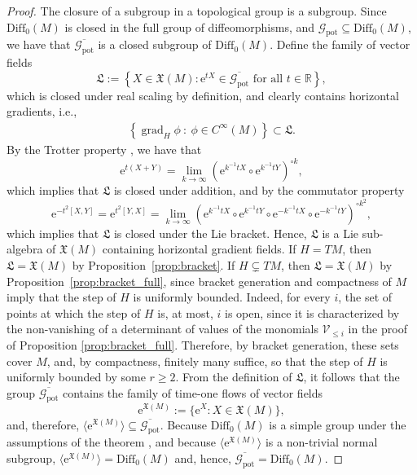 \documentclass{article}
\theoremstyle{remark}
\newcommand{\M}{M}
\newcommand{\Cinf}{C^{\infty}(\M)}
\newcommand{\X}{\mathfrak{X}(\M)}
\newcommand{\Diff}{\mathrm{Diff}_0(\M)}
\DeclareMathOperator{\grad}{\mathrm{grad}}
\newcommand{\GPOT}{\mathcal{G}_{\mathrm{pot}}}
\begin{document}
\begin{proof}
The closure of a subgroup in a topological group is a subgroup. Since $\Diff$ is closed in the full group of diffeomorphisms, and $\GPOT \subseteq \Diff$, we have that $\overline{\GPOT}$ is a closed
subgroup of $\Diff$. Define the family of vector fields
%
$$
\mathfrak{L} :=\left\{ X \in \X : \mathrm{e}^{tX} \in \overline{\GPOT}
\text{ for all } t \in\mathbb{R}\right\},
$$
%
which is closed under real scaling by definition, and clearly contains horizontal gradients, i.e.,
%
\begin{align*}
    \left\{ \grad_H\phi ~:~ \phi\in\Cinf\right\}\subset \mathfrak{L}.
\end{align*}
%
By the Trotter property \cite[pp. 7-8]{Glockner2015}, we have that 
%
$$
\mathrm{e}^{t(X + Y)} = \lim_{k\rightarrow\infty} \left(\mathrm{e}^{k^{-1}t X}\circ\mathrm{e}^{k^{-1}t Y}\right)^{\circ k},
$$ 
%
which implies that $\mathfrak{L}$ is closed under addition, and by the commutator property \cite[pp. 7-8]{Glockner2015}
%
$$
\mathrm{e}^{-t^2[X, Y]} = \mathrm{e}^{t^2[Y, X]} = \lim_{k\rightarrow\infty} \left( \mathrm{e}^{k^{-1}t X}\circ\mathrm{e}^{k^{-1}t Y}\circ
\mathrm{e}^{-k^{-1}t X}\circ\mathrm{e}^{-k^{-1}t Y} \right)^{\circ k^2},
$$ 
%
which implies that $\mathfrak{L}$ is closed under the Lie bracket. Hence, $\mathfrak{L}$ is a Lie sub-algebra of $\X$ containing horizontal
gradient fields. If $H=T\M$, then $\mathfrak{L} = \X$ by
Proposition~\ref{prop:bracket}. If $H\subsetneq T\M$, then $\mathfrak{L} = \X$ by Proposition~\ref{prop:bracket_full}, since bracket generation and compactness of $\M$ imply that the step of $H$ is uniformly bounded. Indeed, for every $i$, the set of points at which the step of $H$ is, at
most, $i$ is open, since it is characterized by the non-vanishing of a determinant of values of the monomials $\mathcal{V}_{\leq i}$ in the proof of Proposition \ref{prop:bracket_full}. Therefore, by bracket generation, these sets cover $\M$, and, by compactness, finitely many
suffice, so that the step of $H$ is uniformly bounded by some $r\geq 2$. From the definition of $\mathfrak{L}$, it follows that the group $\overline{\GPOT} $ contains the family of time-one flows of vector fields
%
$$
\mathrm{e}^{\X} := \{ \mathrm{e}^{X} : X \in \X \},
$$ 
%
and, therefore, $\langle\mathrm{e}^{\X}\rangle\subseteq\overline{\GPOT}$. Because $\Diff$ is a simple group under the assumptions of the theorem \cite{Thurston1974}, and because $\langle\mathrm{e}^{\X}\rangle$ is a non-trivial normal subgroup, $\langle\mathrm{e}^{\X}\rangle = \Diff$ and, hence, $\overline{\GPOT}=\Diff$. 
\end{proof}
%
\end{document}
